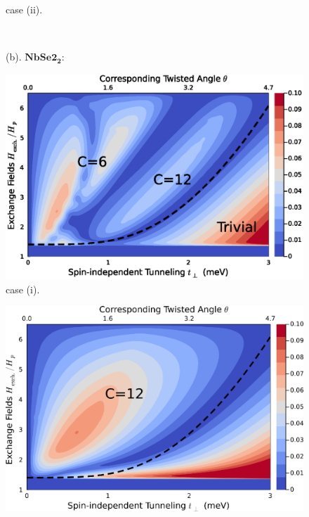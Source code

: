\begin{figure}[!htp]
\begin{minipage}{1.0\textwidth}
\begin{minipage}{0.45\textwidth}
            case (ii).\\
        \end{minipage}
    \end{minipage}
    \\[1em]
    \begin{minipage}{1.0\textwidth}
        \RaggedRight (b). $\mathbf{NbSe2_2:}$\\[0.5em]
        \begin{minipage}{0.45\textwidth}
            \centering
            \includegraphics[width=\linewidth]{contents/Ising_Top/figures/Gap_Size_Phase_Diagram.NbSe2.t_H.magnetic_with_prediction.eps}\\
            case (i).
        \end{minipage}
        \hspace{1em}
        \begin{minipage}{0.45\textwidth}
            \centering
            \includegraphics[width=\linewidth]{contents/Ising_Top/figures/Gap_Size_Phase_Diagram.NbSe2.t_H.non-magnetic_with_prediction.eps}\\

\end{minipage}
\end{minipage}
\end{figure}
